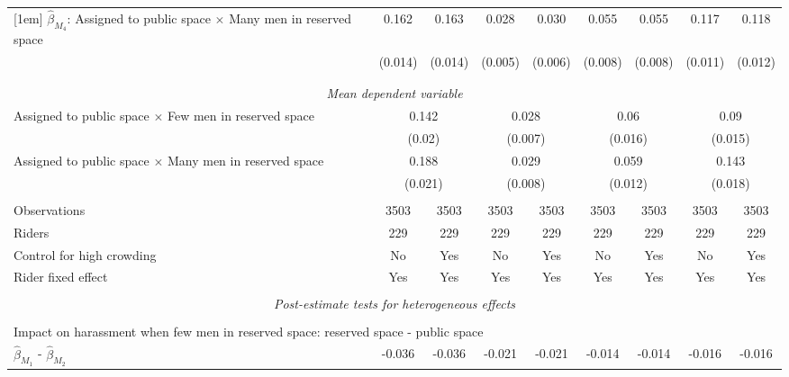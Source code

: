 \begin{tabular}{l*{8}{c}}
[1em]
$\hat\beta_{M_4}$: Assigned to public space $\times$ Many men in reserved space&       0.162\sym{***}&       0.163\sym{***}&       0.028\sym{***}&       0.030\sym{***}&       0.055\sym{***}&       0.055\sym{***}&       0.117\sym{***}&       0.118\sym{***}\\
                    &     (0.014)         &     (0.014)         &     (0.005)         &     (0.006)         &     (0.008)         &     (0.008)         &     (0.011)         &     (0.012)         \\
\\[-1.8ex] \hline \\[-1.8ex] \multicolumn{9}{c}{\textit{Mean dependent variable}} \\ Assigned to public space $\times$ Few men in reserved space& \multicolumn{2}{c}{0.142} & \multicolumn{2}{c}{0.028} & \multicolumn{2}{c}{0.06} & \multicolumn{2}{c}{0.09} \\  & \multicolumn{2}{c}{(0.02)} & \multicolumn{2}{c}{(0.007)} & \multicolumn{2}{c}{(0.016)} & \multicolumn{2}{c}{(0.015)} \\ Assigned to public space $\times$ Many men in reserved space & \multicolumn{2}{c}{0.188} & \multicolumn{2}{c}{0.029} & \multicolumn{2}{c}{0.059} & \multicolumn{2}{c}{0.143} \\  & \multicolumn{2}{c}{(0.021)} & \multicolumn{2}{c}{(0.008)} & \multicolumn{2}{c}{(0.012)} & \multicolumn{2}{c}{(0.018)} \\\\[-1ex] 
Observations        &        3503         &        3503         &        3503         &        3503         &        3503         &        3503         &        3503         &        3503         \\
Riders              &         229         &         229         &         229         &         229         &         229         &         229         &         229         &         229         \\
Control for high crowding&          No         &         Yes         &          No         &         Yes         &          No         &         Yes         &          No         &         Yes         \\
Rider fixed effect  &         Yes         &         Yes         &         Yes         &         Yes         &         Yes         &         Yes         &         Yes         &         Yes         \\
\hline \\[-1ex]  \multicolumn{9}{c}{\textit{Post-estimate tests for heterogeneous effects}} \\\\[-1ex] \multicolumn{9}{l}{Impact on harassment when few men in reserved space: reserved space - public space} \\ \quad $\hat\beta_{M_1}$ - $\hat\beta_{M_2}$&      -0.036         &      -0.036         &      -0.021         &      -0.021         &      -0.014         &      -0.014         &      -0.016         &      -0.016         \\

\end{tabular}
